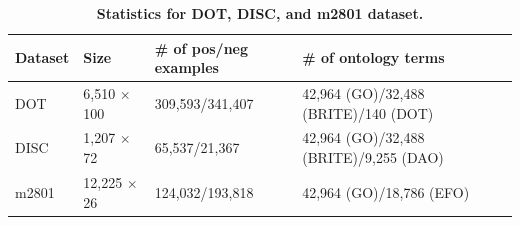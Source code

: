 \documentclass{bmcart}
\begin{document}
\begin{backmatter}
\begin{table}[h!]
\centering
\caption{
{\bf Statistics for DOT, DISC, and m2801 dataset.}}\label{tab:stats}
\begin{tabular}{|l|l|l|l|l|}
\hline
\multicolumn{1}{|l|}{\bf Dataset} & {\bf Size} & {\bf \# of pos/neg examples} & {\bf \# of ontology terms} \\ \hline
DOT & 6,510 $\times$ 100 & 309,593/341,407 & 42,964 (GO)/32,488 (BRITE)/140 (DOT) \\ \hline
DISC & 1,207 $\times$ 72 & 65,537/21,367 & 42,964 (GO)/32,488 (BRITE)/9,255 (DAO) \\ \hline
m2801 & 12,225 $\times$ 26 & 124,032/193,818 & 42,964 (GO)/18,786 (EFO) \\ \hline
\end{tabular}
\end{table}


\end{backmatter}
\end{document}
